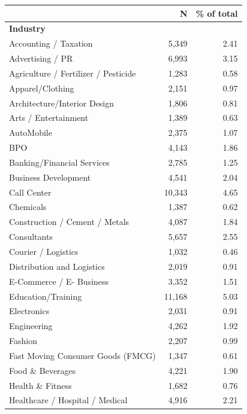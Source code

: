 \begin{tabular}{lrr}


\toprule


 & N & \% of total \\


\midrule


\multicolumn{3}{l}{\textbf{Industry}}\\ 
\midrule
Accounting / Taxation&       5,349&        2.41\\
Advertising / PR    &       6,993&        3.15\\
Agriculture / Fertilizer / Pesticide&       1,283&        0.58\\
Apparel/Clothing    &       2,151&        0.97\\
Architecture/Interior Design&       1,806&        0.81\\
Arts / Entertainment&       1,389&        0.63\\
AutoMobile          &       2,375&        1.07\\
BPO                 &       4,143&        1.86\\
Banking/Financial Services&       2,785&        1.25\\
Business Development&       4,541&        2.04\\
Call Center         &      10,343&        4.65\\
Chemicals           &       1,387&        0.62\\
Construction / Cement / Metals&       4,087&        1.84\\
Consultants         &       5,657&        2.55\\
Courier / Logistics &       1,032&        0.46\\
Distribution and Logistics&       2,019&        0.91\\
E-Commerce / E- Business&       3,352&        1.51\\
Education/Training  &      11,168&        5.03\\
Electronics         &       2,031&        0.91\\
Engineering         &       4,262&        1.92\\
Fashion             &       2,207&        0.99\\
Fast Moving Consumer Goods (FMCG)&       1,347&        0.61\\
Food \& Beverages   &       4,221&        1.90\\
Health \& Fitness   &       1,682&        0.76\\
Healthcare / Hospital / Medical&       4,916&        2.21\\

\end{tabular}
